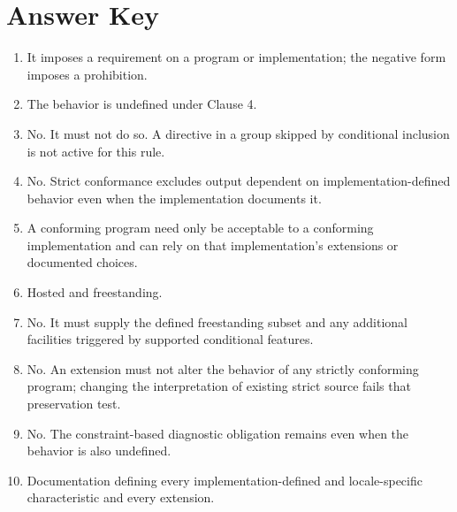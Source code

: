 \documentclass[10pt,letterpaper]{article}
\begin{document}
\section{Answer Key}
\begin{enumerate}
  \item It imposes a requirement on a program or implementation; the negative form imposes a prohibition.

  \item The behavior is undefined under Clause 4.

  \item No. It must not do so. A directive in a group skipped by conditional inclusion is not active for this rule.

  \item No. Strict conformance excludes output dependent on implementation-defined behavior even when the implementation documents it.

  \item A conforming program need only be acceptable to a conforming implementation and can rely on that implementation's extensions or documented choices.

  \item Hosted and freestanding.

  \item No. It must supply the defined freestanding subset and any additional facilities triggered by supported conditional features.

  \item No. An extension must not alter the behavior of any strictly conforming program; changing the interpretation of existing strict source fails that preservation test.

  \item No. The constraint-based diagnostic obligation remains even when the behavior is also undefined.

  \item Documentation defining every implementation-defined and locale-specific characteristic and every extension.
\end{enumerate}
\end{document}

